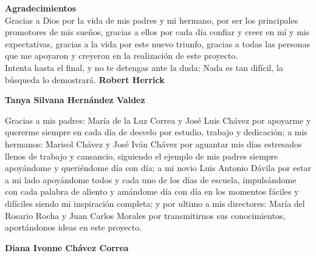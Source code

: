 
\large{\textbf{Agradecimientos}} \\

Gracias a Dios por la vida de mis padres y mi hermano, por ser los principales promotores de mis sueños, gracias a ellos por cada día confiar y creer en mí y mis expectativas, gracias a la vida por este nuevo triunfo, gracias a todas las personas que me apoyaron y creyeron en la realización de este proyecto. \\
Intenta hasta el final, y no te detengas ante la duda; Nada es tan difícil, la búsqueda lo demostrará. \textbf{Robert Herrick
} \\

\begin{flushright}
	\textbf{Tanya Silvana Hernández Valdez} 
\end{flushright} 

Gracias a mis padres: María de la Luz Correa y José Luis Chávez por apoyarme y quererme
siempre en cada día de desvelo por estudio, trabajo y dedicación; a mis hermanos: Marisol
Chávez y José Iván Chávez por aguantar mis días estresados llenos de trabajo y cansancio,
siguiendo el ejemplo de mis padres siempre apoyándome y queriéndome día con día; a mi
novio Luis Antonio Dávila por estar a mi lado apoyándome todos y cada uno de los días de
escuela, impulsándome con cada palabra de aliento y amándome día con día en los momentos
fáciles y difíciles siendo mi inspiración completa; y por ultimo a mis directores: María del
Rosario Rocha y Juan Carlos Morales por transmitirnos sus conocimientos, aportándonos
ideas en este proyecto.\\

\begin{flushright}
	\textbf{Diana Ivonne Chávez Correa} \\
\end{flushright} 
